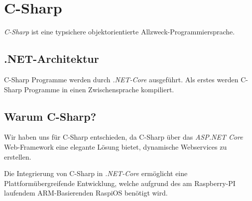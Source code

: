 \section{C-Sharp}
\label{C-Sharp}

\textit{C-Sharp} ist eine typsichere objektorientierte Allzweck-Programmiersprache. \cite{csharpwikipedia}

\subsection{.NET-Architektur}
C-Sharp Programme werden durch \textit{.NET-Core} ausgeführt. Als erstes werden C-Sharp Programme in einen Zwischensprache kompiliert.

\subsection{Warum C-Sharp?}
Wir haben uns für C-Sharp entschieden, da C-Sharp über das \textit{ASP.NET Core} Web-Framework eine elegante Lösung bietet, dynamische Webservices zu erstellen.

Die Integrierung von C-Sharp in \textit{.NET-Core} ermöglicht eine Plattformübergreifende Entwicklung, welche aufgrund des am Raspberry-PI laufendem ARM-Basierenden RaspiOS benötigt wird.